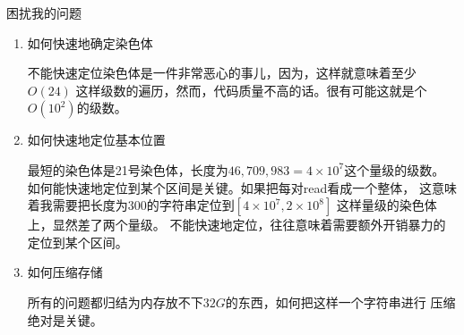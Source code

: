 \documentclass[hyperref,UTF8]{ctexart}
\theoremstyle{definition}
\theoremstyle{remark}
\numberwithin{equation}{subsection}
\begin{document}
	困扰我的问题
	\begin{enumerate}
	
		\item 如何快速地确定染色体
		
		不能快速定位染色体是一件非常恶心的事儿，因为，这样就意味着至少$O(24)$
		这样级数的遍历，然而，代码质量不高的话。很有可能这就是个$O(10^2)$的级数。
		
		\item 如何快速地定位基本位置
		
		最短的染色体是21号染色体，长度为$46,709,983 = 4 \times 10^7$这个量级的级数。
		如何能快速地定位到某个区间是关键。如果把每对read看成一个整体，
		这意味着我需要把长度为300的字符串定位到$[4\times10^7, 2\times10^8]$
		这样量级的染色体上，显然差了两个量级。
		不能快速地定位，往往意味着需要额外开销暴力的定位到某个区间。
		
		\item 如何压缩存储
		
		所有的问题都归结为内存放不下$32G$的东西，如何把这样一个字符串进行
		压缩绝对是关键。
		
	\end{enumerate}
	
		
		
		
		
		
		
	
\end{document}
